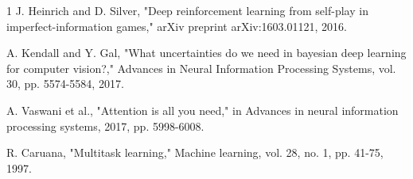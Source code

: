 \documentclass[conference]{IEEEtran}
\begin{document}
\begin{thebibliography}{1}
J. Heinrich and D. Silver, "Deep reinforcement learning from self-play in imperfect-information games," arXiv preprint arXiv:1603.01121, 2016.

A. Kendall and Y. Gal, "What uncertainties do we need in bayesian deep learning for computer vision?," Advances in Neural Information Processing Systems, vol. 30, pp. 5574-5584, 2017.

A. Vaswani et al., "Attention is all you need," in Advances in neural information processing systems, 2017, pp. 5998-6008.

R. Caruana, "Multitask learning," Machine learning, vol. 28, no. 1, pp. 41-75, 1997.

\end{thebibliography}
\end{document}
